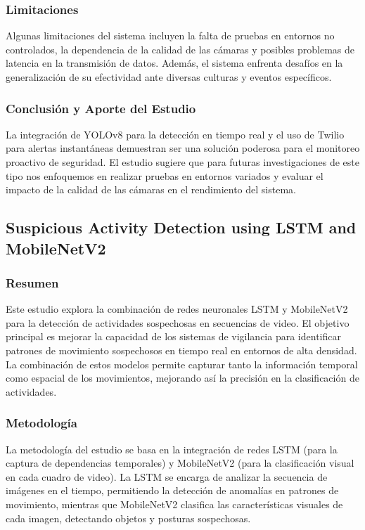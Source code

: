 \documentclass[listof=nochaptergap,12pt,times,authoryear]{report}
\begin{document}
\clearpage


\subsubsection{Limitaciones}
Algunas limitaciones del sistema incluyen la falta de pruebas en entornos no controlados, la dependencia de la calidad de las cámaras y posibles problemas de latencia en la transmisión de datos. Además, el sistema enfrenta desafíos en la generalización de su efectividad ante diversas culturas y eventos específicos.

\subsubsection{Conclusión y Aporte del Estudio}
La integración de YOLOv8 para la detección en tiempo real y el uso de Twilio para alertas instantáneas demuestran ser una solución poderosa para el monitoreo proactivo de seguridad. El estudio sugiere que para futuras investigaciones de este tipo nos enfoquemos en realizar pruebas en entornos variados y evaluar el impacto de la calidad de las cámaras en el rendimiento del sistema.



\subsection{Suspicious Activity Detection using LSTM and MobileNetV2}

\subsubsection{Resumen}
Este estudio explora la combinación de redes neuronales LSTM y MobileNetV2 para la detección de actividades sospechosas en secuencias de video. El objetivo principal es mejorar la capacidad de los sistemas de vigilancia para identificar patrones de movimiento sospechosos en tiempo real en entornos de alta densidad. La combinación de estos modelos permite capturar tanto la información temporal como espacial de los movimientos, mejorando así la precisión en la clasificación de actividades.

\subsubsection{Metodología}
La metodología del estudio se basa en la integración de redes LSTM (para la captura de dependencias temporales) y MobileNetV2 (para la clasificación visual en cada cuadro de video). La LSTM se encarga de analizar la secuencia de imágenes en el tiempo, permitiendo la detección de anomalías en patrones de movimiento, mientras que MobileNetV2 clasifica las características visuales de cada imagen, detectando objetos y posturas sospechosas.
\end{document}
